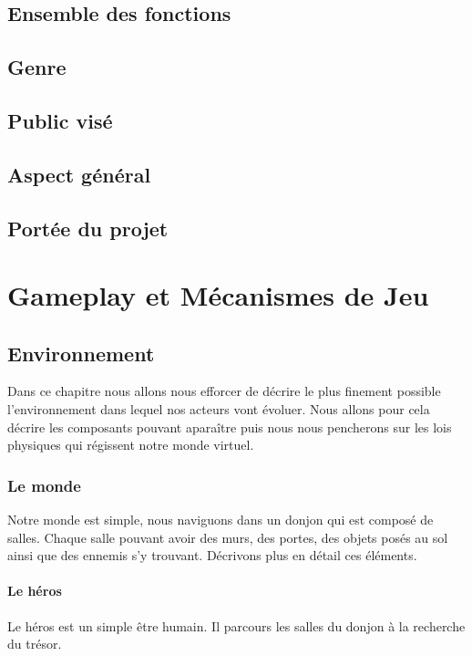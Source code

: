 \documentclass[a4paper, 11pt]{report}
\begin{document}
    \chapter{Ensemble des fonctions}

    \chapter{Genre}
  
    \chapter{Public visé}

    \chapter{Aspect général}

    \chapter{Portée du projet}

  \part{Gameplay et Mécanismes de Jeu}

    \chapter{Environnement}
      Dans ce chapitre nous allons nous efforcer de décrire le plus finement possible l'environnement dans
      lequel nos acteurs vont évoluer. Nous allons pour cela décrire les composants pouvant apara\^itre 
      puis nous nous pencherons sur les lois physiques qui régissent notre monde virtuel.

      \section{Le monde}
        Notre monde est simple, nous naviguons dans un donjon qui est composé de salles. Chaque salle 
        pouvant avoir des murs, des portes, des objets posés au sol ainsi que des ennemis s'y trouvant.
        Décrivons plus en détail ces éléments.

        \subsection{Le héros}
          Le héros est un simple \^etre humain. Il parcours les salles du donjon à la recherche du trésor.
\end{document}
